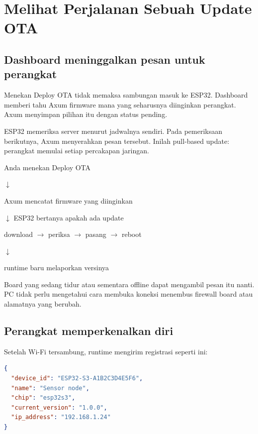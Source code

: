 \chapter{Melihat Perjalanan Sebuah Update OTA}

\section{Dashboard meninggalkan pesan untuk perangkat}

Menekan Deploy OTA tidak memaksa sambungan masuk ke ESP32. Dashboard memberi tahu Axum firmware mana yang seharusnya diinginkan perangkat. Axum menyimpan pilihan itu dengan status pending.

ESP32 memeriksa server menurut jadwalnya sendiri. Pada pemeriksaan berikutnya, Axum menyerahkan pesan tersebut. Inilah pull-based update: perangkat memulai setiap percakapan jaringan.

\begin{center}
\begin{tcolorbox}[width=0.92\textwidth,colback=BookPaper,colframe=BookTealLight]
\centering\ttfamily
Anda menekan Deploy OTA\par
$\downarrow$\par
Axum mencatat firmware yang diinginkan\par
$\downarrow$ ESP32 bertanya apakah ada update\par
download $\rightarrow$ periksa $\rightarrow$ pasang $\rightarrow$ reboot\par
$\downarrow$\par
runtime baru melaporkan versinya
\end{tcolorbox}
\end{center}

Board yang sedang tidur atau sementara offline dapat mengambil pesan itu nanti. PC tidak perlu mengetahui cara membuka koneksi menembus firewall board atau alamatnya yang berubah.

\section{Perangkat memperkenalkan diri}

Setelah Wi-Fi tersambung, runtime mengirim registrasi seperti ini:

\begin{lstlisting}[language=JSON,numbers=none]
{
  "device_id": "ESP32-S3-A1B2C3D4E5F6",
  "name": "Sensor node",
  "chip": "esp32s3",
  "current_version": "1.0.0",
  "ip_address": "192.168.1.24"
}
\end{lstlisting}

